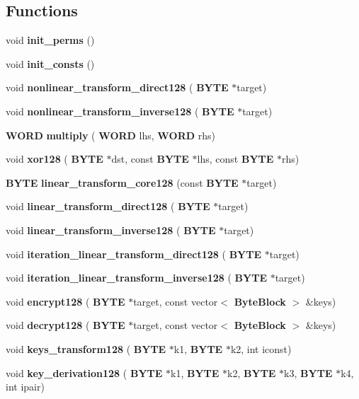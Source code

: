 \subsection*{Functions}
\begin{DoxyCompactItemize}
\item 
void \textbf{ init\+\_\+perms} ()
\item 
void \textbf{ init\+\_\+consts} ()
\item 
void \textbf{ nonlinear\+\_\+transform\+\_\+direct128} (\textbf{ B\+Y\+TE} $\ast$target)
\item 
void \textbf{ nonlinear\+\_\+transform\+\_\+inverse128} (\textbf{ B\+Y\+TE} $\ast$target)
\item 
\textbf{ W\+O\+RD} \textbf{ multiply} (\textbf{ W\+O\+RD} lhs, \textbf{ W\+O\+RD} rhs)
\item 
void \textbf{ xor128} (\textbf{ B\+Y\+TE} $\ast$dst, const \textbf{ B\+Y\+TE} $\ast$lhs, const \textbf{ B\+Y\+TE} $\ast$rhs)
\item 
\textbf{ B\+Y\+TE} \textbf{ linear\+\_\+transform\+\_\+core128} (const \textbf{ B\+Y\+TE} $\ast$target)
\item 
void \textbf{ linear\+\_\+transform\+\_\+direct128} (\textbf{ B\+Y\+TE} $\ast$target)
\item 
void \textbf{ linear\+\_\+transform\+\_\+inverse128} (\textbf{ B\+Y\+TE} $\ast$target)
\item 
void \textbf{ iteration\+\_\+linear\+\_\+transform\+\_\+direct128} (\textbf{ B\+Y\+TE} $\ast$target)
\item 
void \textbf{ iteration\+\_\+linear\+\_\+transform\+\_\+inverse128} (\textbf{ B\+Y\+TE} $\ast$target)
\item 
void \textbf{ encrypt128} (\textbf{ B\+Y\+TE} $\ast$target, const vector$<$ \textbf{ Byte\+Block} $>$ \&keys)
\item 
void \textbf{ decrypt128} (\textbf{ B\+Y\+TE} $\ast$target, const vector$<$ \textbf{ Byte\+Block} $>$ \&keys)
\item 
void \textbf{ keys\+\_\+transform128} (\textbf{ B\+Y\+TE} $\ast$k1, \textbf{ B\+Y\+TE} $\ast$k2, int iconst)
\item 
void \textbf{ key\+\_\+derivation128} (\textbf{ B\+Y\+TE} $\ast$k1, \textbf{ B\+Y\+TE} $\ast$k2, \textbf{ B\+Y\+TE} $\ast$k3, \textbf{ B\+Y\+TE} $\ast$k4, int ipair)
\end{DoxyCompactItemize}
